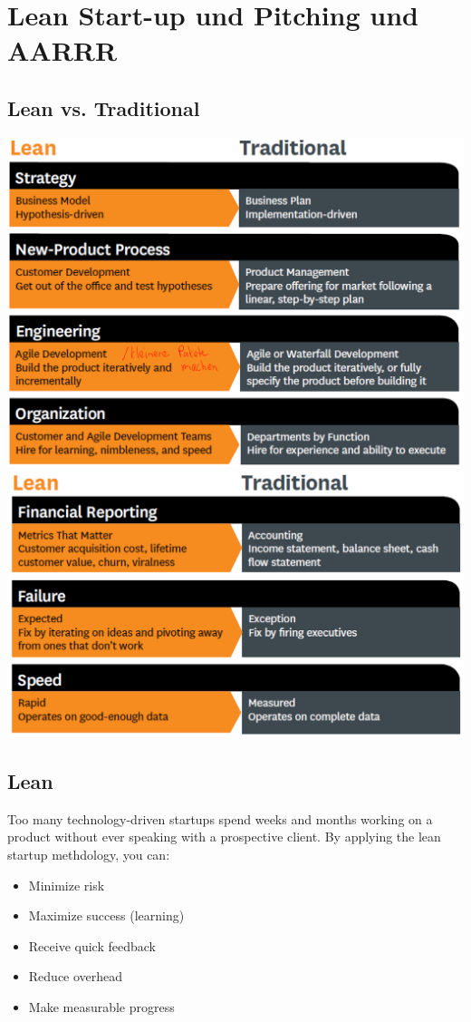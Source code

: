 \section{Lean Start-up und Pitching und AARRR}
\subsection{Lean vs. Traditional}
\begin{multicols}{2}
	\includegraphics[width=1\linewidth]{images/lean}
	\includegraphics[width=1\linewidth]{images/lean_2}
\end{multicols}

\subsection{Lean}
Too many technology-driven startups spend weeks and months working on a product without ever speaking with a prospective client. By applying the lean startup methdology, you can:
\begin{itemize}
	\item Minimize risk
	\item Maximize success (learning)
	\item Receive quick feedback
	\item Reduce overhead
	\item Make measurable progress
\end{itemize}

